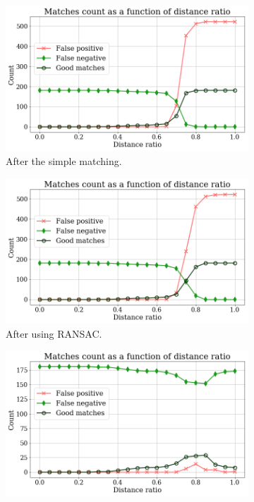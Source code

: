 \documentclass[fleqn,10pt]{wlpeerj} %
\begin{document}
\begin{figure}[H]
\centering
\hspace*{-0.36em}
\begin{minipage}{1.08\textwidth}
\begin{subfigure}{0.324\textwidth}
    \includegraphics[width=1\linewidth]{figure_distance_ratio_without_robust.png}
    \caption{After the simple matching.}
    \label{res:1}
\end{subfigure}
\begin{subfigure}{0.324\textwidth}
    \includegraphics[width=1\linewidth]{figure_distance_ratio_with_ransac.png}
    \caption{After using RANSAC.}
    \label{res:2}
\end{subfigure}
\begin{subfigure}{0.324\textwidth}
    \includegraphics[width=1\linewidth]{figure_distance_ratio_with_resfilt.png}

\end{subfigure}
\end{minipage}
\end{figure}
\end{document}
